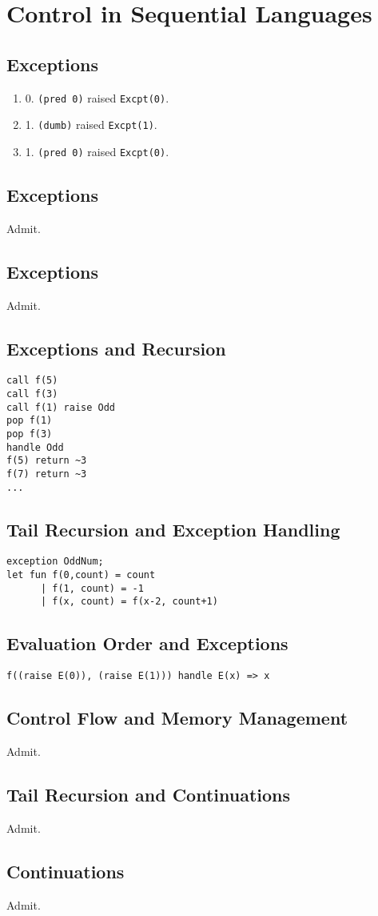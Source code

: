 \chapter{Control in Sequential Languages}

\section{Exceptions}
\begin{enumerate}
  \item 0. \texttt{(pred 0)} raised \texttt{Excpt(0)}.
  \item 1. \texttt{(dumb)} raised \texttt{Excpt(1)}.
  \item 1. \texttt{(pred 0)} raised \texttt{Excpt(0)}.
\end{enumerate}


\section{Exceptions}
Admit.


\section{Exceptions}
Admit.


\section{Exceptions and Recursion}
\begin{verbatim}
call f(5)
call f(3)
call f(1) raise Odd
pop f(1)
pop f(3)
handle Odd
f(5) return ~3
f(7) return ~3
...
\end{verbatim} 


\section{Tail Recursion and Exception Handling}
\begin{verbatim}
exception OddNum;
let fun f(0,count) = count
      | f(1, count) = -1
      | f(x, count) = f(x-2, count+1)
\end{verbatim}


\section{Evaluation Order and Exceptions}
\begin{verbatim}
f((raise E(0)), (raise E(1))) handle E(x) => x
\end{verbatim}


\section{Control Flow and Memory Management}
Admit.


\section{Tail Recursion and Continuations}
Admit.


\section{Continuations}
Admit.



